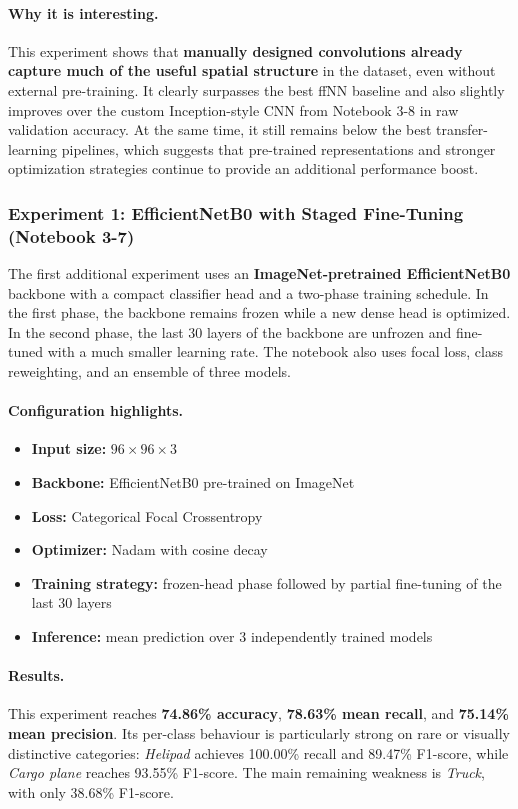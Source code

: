\paragraph{Why it is interesting.} This experiment shows that \textbf{manually designed convolutions already capture much of the useful spatial structure} in the dataset, even without external pre-training. It clearly surpasses the best ffNN baseline and also slightly improves over the custom Inception-style CNN from Notebook 3-8 in raw validation accuracy. At the same time, it still remains below the best transfer-learning pipelines, which suggests that pre-trained representations and stronger optimization strategies continue to provide an additional performance boost.

\subsubsection{Experiment 1: EfficientNetB0 with Staged Fine-Tuning (Notebook 3-7)}

The first additional experiment uses an \textbf{ImageNet-pretrained EfficientNetB0} backbone with a compact classifier head and a two-phase training schedule. In the first phase, the backbone remains frozen while a new dense head is optimized. In the second phase, the last 30 layers of the backbone are unfrozen and fine-tuned with a much smaller learning rate. The notebook also uses focal loss, class reweighting, and an ensemble of three models.

\paragraph{Configuration highlights.}
\begin{itemize}
    \item \textbf{Input size:} $96 \times 96 \times 3$
    \item \textbf{Backbone:} EfficientNetB0 pre-trained on ImageNet
    \item \textbf{Loss:} Categorical Focal Crossentropy
    \item \textbf{Optimizer:} Nadam with cosine decay
    \item \textbf{Training strategy:} frozen-head phase followed by partial fine-tuning of the last 30 layers
    \item \textbf{Inference:} mean prediction over 3 independently trained models
\end{itemize}

\paragraph{Results.} This experiment reaches \textbf{74.86\% accuracy}, \textbf{78.63\% mean recall}, and \textbf{75.14\% mean precision}. Its per-class behaviour is particularly strong on rare or visually distinctive categories: \textit{Helipad} achieves 100.00\% recall and 89.47\% F1-score, while \textit{Cargo plane} reaches 93.55\% F1-score. The main remaining weakness is \textit{Truck}, with only 38.68\% F1-score.

